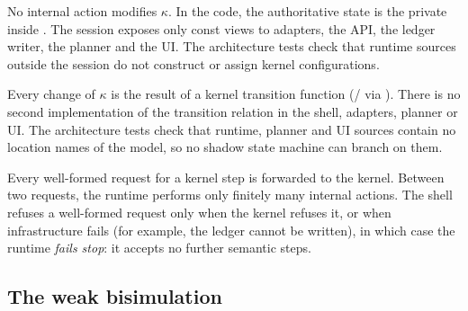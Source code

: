 \begin{assumption}\label{ass:isolation}
No internal action modifies $\kappa$. In the code, the authoritative state is
the private  inside . The session exposes
only const views to adapters, the API, the ledger writer, the planner and the
UI. The architecture tests check that runtime sources outside the session do
not construct or assign kernel configurations.
\end{assumption}

\begin{assumption}\label{ass:authority}
Every change of $\kappa$ is the result of a kernel transition function
(/ via ). There is no second
implementation of the transition relation in the shell, adapters, planner or UI.
The architecture tests check that runtime, planner and UI sources contain no
location names of the model, so no shadow state machine can branch on them.
\end{assumption}

\begin{assumption}\label{ass:available}
Every well-formed request for a kernel step is forwarded to the kernel. Between
two requests, the runtime performs only finitely many internal actions. The
shell refuses a well-formed request only when the kernel refuses it, or when
infrastructure fails (for example, the ledger cannot be written), in which case
the runtime \emph{fails stop}: it accepts no further semantic steps.
\end{assumption}

\subsection{The weak bisimulation}

